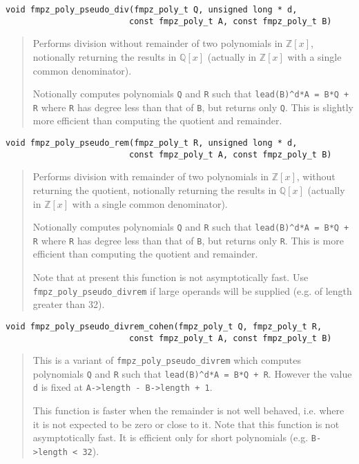 \documentclass[a4paper,10pt]{article}
\newcommand{\Z}{\mathbb{Z}}
\newcommand{\Q}{\mathbb{Q}}
\newcommand{\code}{\lstinline}
\begin{document}
\begin{lstlisting}
void fmpz_poly_pseudo_div(fmpz_poly_t Q, unsigned long * d, 
                         const fmpz_poly_t A, const fmpz_poly_t B)
\end{lstlisting}
\begin{quote}
Performs division without remainder of two polynomials in $\Z[x]$, notionally returning the results in $\Q[x]$ (actually in $\Z[x]$ with a single common denominator).

Notionally computes polynomials \code{Q} and \code{R} such that \code{lead(B)^d*A = B*Q + R} where \code{R} has degree less than that of \code{B}, but returns only \code{Q}. This is slightly more efficient than computing the quotient and remainder.
\end{quote}

\begin{lstlisting}
void fmpz_poly_pseudo_rem(fmpz_poly_t R, unsigned long * d, 
                         const fmpz_poly_t A, const fmpz_poly_t B)
\end{lstlisting}
\begin{quote}
Performs division with remainder of two polynomials in $\Z[x]$, without returning the quotient, notionally returning the results in $\Q[x]$ (actually in $\Z[x]$ with a single common denominator).

Notionally computes polynomials \code{Q} and \code{R} such that \code{lead(B)^d*A = B*Q + R} where \code{R} has degree less than that of \code{B}, but returns only \code{R}. This is more efficient than computing the quotient and remainder.

Note that at present this function is not asymptotically fast. Use \code{fmpz_poly_pseudo_divrem} if large operands will be supplied (e.g. of length greater than 32).
\end{quote}

\begin{lstlisting}
void fmpz_poly_pseudo_divrem_cohen(fmpz_poly_t Q, fmpz_poly_t R, 
                         const fmpz_poly_t A, const fmpz_poly_t B)
\end{lstlisting}
\begin{quote}
This is a variant of \code{fmpz_poly_pseudo_divrem} which computes polynomials \code{Q} and \code{R} such that \code{lead(B)^d*A = B*Q + R}. However the value \code{d} is fixed at \code{A->length - B->length + 1}.

This function is faster when the remainder is not well behaved, i.e. where it is not expected to be zero or close to it. Note that this function is not asymptotically fast. It is efficient only for short polynomials (e.g. \code{B->length < 32}).
\end{quote}
\end{document}
